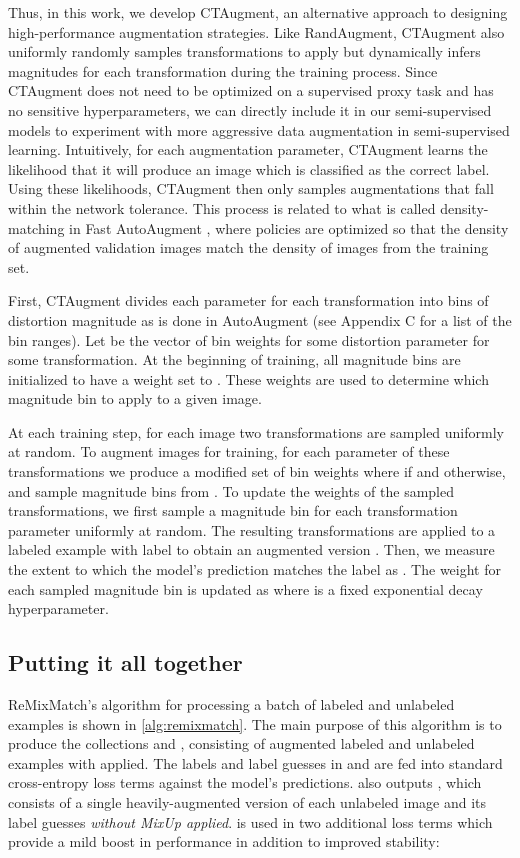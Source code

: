 \documentclass{article} \usepackage{iclr2020_conference,times}
\begin{document}
Thus, in this work, we develop CTAugment, an alternative approach to designing high-performance augmentation strategies.
Like RandAugment, CTAugment also uniformly randomly samples transformations to apply but dynamically infers magnitudes for each transformation during the training process.
Since CTAugment does not need to be optimized on a supervised proxy task and has no sensitive hyperparameters, we can directly include it in our semi-supervised models to experiment with more aggressive data augmentation in semi-supervised learning.   
Intuitively, for each augmentation parameter, CTAugment learns the likelihood that it will produce an image which is classified as the correct label.
Using these likelihoods, CTAugment then only samples augmentations that fall within the network tolerance.
This process is related to what is called density-matching in Fast AutoAugment \citep{lim2019fast}, where policies are optimized so that the density of augmented validation images match the density of images from the training set. 

First, CTAugment divides each parameter for each transformation into bins of distortion magnitude as is done in AutoAugment (see Appendix C for a list of the bin ranges).
Let  be the vector of bin weights for some distortion parameter for some transformation.
At the beginning of training, all magnitude bins are initialized to have a weight set to .
These weights are used to determine which magnitude bin to apply to a given image.

At each training step, for each image two transformations are sampled uniformly at random.
To augment images for training, for each parameter of these transformations we produce a modified set of bin weights  where  if  and  otherwise, and sample magnitude bins from .
To update the weights of the sampled transformations, we first sample a magnitude bin  for each transformation parameter uniformly at random.
The resulting transformations are applied to a labeled example  with label  to obtain an augmented version .
Then, we measure the extent to which the model's prediction matches the label as .
The weight for each sampled magnitude bin is updated as  where  is a fixed exponential decay hyperparameter.


\subsection{Putting it all together}

ReMixMatch's algorithm for processing a batch of labeled and unlabeled examples is shown in \cref{alg:remixmatch}.
The main purpose of this algorithm is to produce the collections  and , consisting of augmented labeled and unlabeled examples with  applied.
The labels and label guesses in  and  are fed into standard cross-entropy loss terms against the model's predictions.
 also outputs , which consists of a single heavily-augmented version of each unlabeled image and its label guesses \emph{without MixUp applied}.
 is used in two additional loss terms which provide a mild boost in performance in addition to improved stability:
\end{document}

